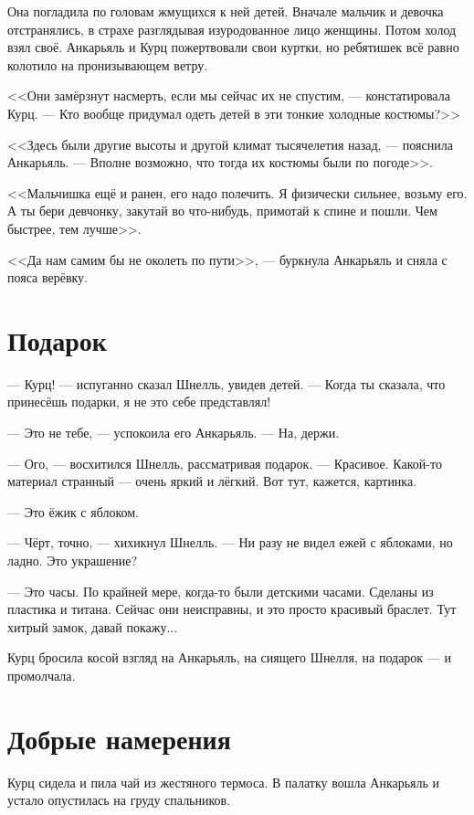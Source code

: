 \documentclass[a4paper,10pt,fleqn]{book}\usepackage{polyglossia}\setdefaultlanguage{english}\setotherlanguage{russian}\defaultfontfeatures{Ligatures=TeX,Mapping=tex-text}\usepackage{xcolor}\definecolor{lightgray}{HTML}{bbbbbb}\color{lightgray}\newcommand{\ml}[3]{\textcolor{black}{#3}}
\begin{document}
Она погладила по головам жмущихся к ней детей.
Вначале мальчик и девочка отстранялись, в страхе разглядывая изуродованное лицо женщины.
Потом холод взял своё.
Анкарьяль и Курц пожертвовали свои куртки, но ребятишек всё равно колотило на пронизывающем ветру.

<<Они замёрзнут насмерть, если мы сейчас их не спустим, --- констатировала Курц.
--- Кто вообще придумал одеть детей в эти тонкие холодные костюмы?>>

<<Здесь были другие высоты и другой климат тысячелетия назад, --- пояснила Анкарьяль.
--- Вполне возможно, что тогда их костюмы были по погоде>>.

<<Мальчишка ещё и ранен, его надо полечить.
Я физически сильнее, возьму его.
А ты бери девчонку, закутай во что-нибудь, примотай к спине и пошли.
Чем быстрее, тем лучше>>.

<<Да нам самим бы не околеть по пути>>, --- буркнула Анкарьяль и сняла с пояса верёвку.

\section{Подарок}

--- Курц! --- испуганно сказал Шнелль, увидев детей.
--- Когда ты сказала, что принесёшь подарки, я не это себе представлял!

--- Это не тебе, --- успокоила его Анкарьяль.
--- На, держи.

--- Ого, --- восхитился Шнелль, рассматривая подарок.
--- Красивое.
Какой-то материал странный --- очень яркий и лёгкий.
Вот тут, кажется, картинка.

--- Это ёжик с яблоком.

--- Чёрт, точно, --- хихикнул Шнелль.
--- Ни разу не видел ежей с яблоками, но ладно.
Это украшение?

--- Это часы.
По крайней мере, когда-то были детскими часами.
Сделаны из пластика и титана.
Сейчас они неисправны, и это просто красивый браслет.
Тут хитрый замок, давай покажу...

Курц бросила косой взгляд на Анкарьяль, на сиящего Шнелля, на подарок --- и промолчала.

\section{Добрые намерения}

Курц сидела и пила чай из жестяного термоса.
В палатку вошла Анкарьяль и устало опустилась на груду спальников.
\end{document}
